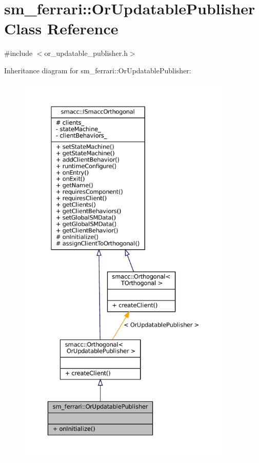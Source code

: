 \hypertarget{classsm__ferrari_1_1OrUpdatablePublisher}{}\section{sm\+\_\+ferrari\+:\+:Or\+Updatable\+Publisher Class Reference}
\label{classsm__ferrari_1_1OrUpdatablePublisher}


{\ttfamily \#include $<$or\+\_\+updatable\+\_\+publisher.\+h$>$}



Inheritance diagram for sm\+\_\+ferrari\+:\+:Or\+Updatable\+Publisher\+:
\nopagebreak
\begin{figure}[H]
\begin{center}
\leavevmode
\includegraphics[height=550pt]{classsm__ferrari_1_1OrUpdatablePublisher__inherit__graph}
\end{center}
\end{figure}


